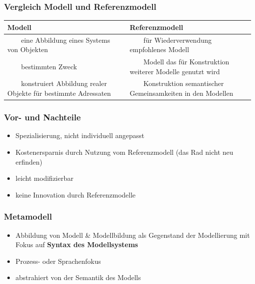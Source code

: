 \documentclass[a4paper]{article}
\newcommand{\tabitem}{~~\llap{\textbullet}~~}
\begin{document}
			\subsubsection{Vergleich Modell und Referenzmodell}
			\begin{tabularx}{\textwidth}{X|X}
				\toprule
				Modell & Referenzmodell \\
				\midrule
				\tabitem eine Abbildung eines Systems von Objekten & \tabitem für Wiederverwendung empfohlenes Modell \\
				\tabitem bestimmten Zweck & \tabitem Modell das für Konstruktion weiterer Modelle genutzt wird \\
				\tabitem konstruiert Abbildung realer Objekte für bestimmte Adressaten & \tabitem Konstruktion semantischer Gemeinsamkeiten in den Modellen \\
				\bottomrule
			\end{tabularx}
			
			
			
			\subsubsection{Vor- und Nachteile}
			\begin{itemize}
				\item Spezialisierung, nicht individuell angepasst
				\item Kostenersparnis durch Nutzung vom Referenzmodell (das Rad nicht neu erfinden)
				\item leicht modifizierbar
				\item keine Innovation durch Referenzmodelle
			\end{itemize}
			\hrulefill
			
			
			
			\subsubsection{Metamodell}
			\begin{itemize}
				\item Abbildung von Modell \& Modellbildung als Gegenstand der Modellierung mit Fokus auf \textbf{Syntax des Modellsystems}
				\item Prozess- oder Sprachenfokus
				\item abstrahiert von der Semantik des Modells
			\end{itemize}
			
\end{document}
